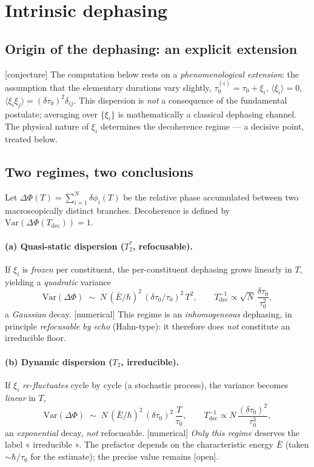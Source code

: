 \documentclass[11pt,a4paper]{article}
\newcommand{\statut}[1]{{\footnotesize\textsf{[#1]}}}
\theoremstyle{plain}
\theoremstyle{definition}
\theoremstyle{remark}
\begin{document}
\section{Intrinsic dephasing}\label{sec:deco}
\subsection{Origin of the dephasing: an explicit extension}\label{sec:disp}
\statut{conjecture} The computation below rests on a \emph{phenomenological
extension}: the assumption that the elementary durations vary slightly,
$\tau_0^{(i)}=\tau_0+\xi_i$, $\langle\xi_i\rangle=0$,
$\langle\xi_i\xi_j\rangle=(\delta\tau_0)^2\delta_{ij}$. This dispersion is
\emph{not} a consequence of the fundamental postulate; averaging over $\{\xi_i\}$
is mathematically a classical dephasing channel. The physical nature of $\xi_i$
determines the decoherence regime --- a decisive point, treated below.

\subsection{Two regimes, two conclusions}
Let $\Delta\Phi(T)=\sum_{i=1}^{N}\delta\phi_i(T)$ be the relative phase accumulated
between two macroscopically distinct branches. Decoherence is defined by
$\mathrm{Var}(\Delta\Phi(T_{\mathrm{dec}}))=1$.

\paragraph{(a) Quasi-static dispersion ($T_2^\ast$, refocusable).} If $\xi_i$ is
\emph{frozen} per constituent, the per-constituent dephasing grows linearly in $T$,
yielding a \emph{quadratic} variance
\[
\mathrm{Var}(\Delta\Phi)\;\sim\; N\,(\bar E/\hbar)^2\,(\delta\tau_0/\tau_0)^2\,T^2,
\qquad
T_{\mathrm{dec}}^{-1}\propto \sqrt{N}\,\frac{\delta\tau_0}{\tau_0^2},
\]
a \emph{Gaussian} decay. \statut{numerical} This regime is an \emph{inhomogeneous}
dephasing, in principle \emph{refocusable by echo} (Hahn-type): it therefore does
\emph{not} constitute an irreducible floor.

\paragraph{(b) Dynamic dispersion ($T_2$, irreducible).} If $\xi_i$
\emph{re-fluctuates} cycle by cycle (a stochastic process), the variance becomes
\emph{linear} in $T$,
\[
\mathrm{Var}(\Delta\Phi)\;\sim\; N\,(\bar E/\hbar)^2\,(\delta\tau_0)^2\,\frac{T}{\tau_0},
\qquad
T_{\mathrm{dec}}^{-1}\propto N\,\frac{(\delta\tau_0)^2}{\tau_0^3},
\]
an \emph{exponential} decay, \emph{not} refocusable. \statut{numerical}
\emph{Only this regime} deserves the label « irreducible ». The prefactor depends
on the characteristic energy $\bar E$ (taken $\sim\hbar/\tau_0$ for the estimate);
the precise value remains \statut{open}.
\end{document}
